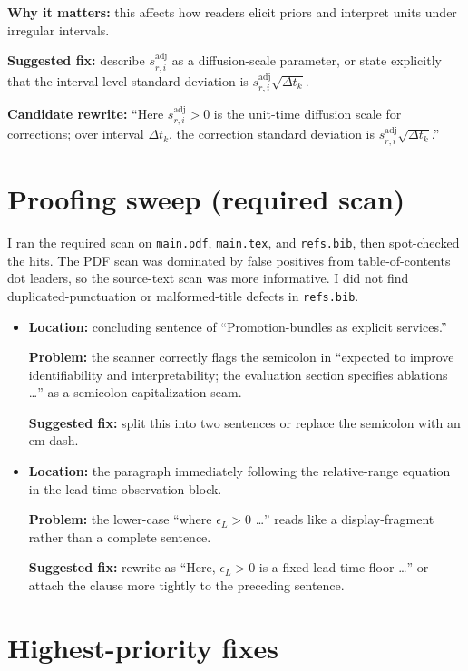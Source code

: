 \documentclass[11pt]{article}
\begin{document}
\begin{enumerate}
  \textbf{Why it matters:} this affects how readers elicit priors and interpret units under irregular intervals.

  \textbf{Suggested fix:} describe $s^{\mathrm{adj}}_{r,i}$ as a diffusion-scale parameter, or state explicitly that the interval-level standard deviation is $s^{\mathrm{adj}}_{r,i}\sqrt{\Delta t_k}$.

  \textbf{Candidate rewrite:} ``Here $s^{\mathrm{adj}}_{r,i}>0$ is the unit-time diffusion scale for corrections; over interval $\Delta t_k$, the correction standard deviation is $s^{\mathrm{adj}}_{r,i}\sqrt{\Delta t_k}$.''
\end{enumerate}

\section*{Proofing sweep (required scan)}

I ran the required scan on \texttt{main.pdf}, \texttt{main.tex}, and \texttt{refs.bib}, then spot-checked the hits.
The PDF scan was dominated by false positives from table-of-contents dot leaders, so the source-text scan was more informative.
I did not find duplicated-punctuation or malformed-title defects in \texttt{refs.bib}.

\begin{itemize}
  \item \textbf{Location:} concluding sentence of ``Promotion-bundles as explicit services.''

  \textbf{Problem:} the scanner correctly flags the semicolon in ``expected to improve identifiability and interpretability; the evaluation section specifies ablations \dots'' as a semicolon-capitalization seam.

  \textbf{Suggested fix:} split this into two sentences or replace the semicolon with an em dash.

  \item \textbf{Location:} the paragraph immediately following the relative-range equation in the lead-time observation block.

  \textbf{Problem:} the lower-case ``where $\epsilon_L>0$ \dots'' reads like a display-fragment rather than a complete sentence.

  \textbf{Suggested fix:} rewrite as ``Here, $\epsilon_L>0$ is a fixed lead-time floor \dots'' or attach the clause more tightly to the preceding sentence.
\end{itemize}

\section*{Highest-priority fixes}
\end{document}
